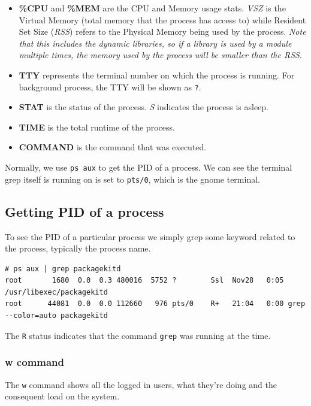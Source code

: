 \begin{itemize}
\begin{itemize}
		\item \textbf{\%CPU} and \textbf{\%MEM} are the CPU and Memory usage stats. \textit{VSZ} is the Virtual Memory (total memory that the process has access to) while Resident Set Size (\textit{RSS}) refers to the Physical Memory being used by the process. \textit{Note that this includes the dynamic libraries, so if a library is used by a module multiple times, the memory used by the process will be smaller than the RSS}.
		
		\item \textbf{TTY} represents the terminal number on which the process is running. For background process, the TTY will be shown as \verb|?|. 
		
		\item \textbf{STAT} is the status of the process. \textit{S} indicates the process is asleep. 
		
		\item \textbf{TIME} is the total runtime of the process.
		\item \textbf{COMMAND} is the command that was executed.
	\end{itemize}
\end{itemize}

Normally, we use \verb|ps aux| to get the PID of a process. We can see the terminal grep itself is running on is set to \verb|pts/0|, which is the gnome terminal. 

\subsection{Getting PID of a process}
To see the PID of a particular process we simply grep some keyword related to the process, typically the process name. 

\vspace{-15pt}
\begin{verbatim}
# ps aux | grep packagekitd
root       1680  0.0  0.3 480016  5752 ?        Ssl  Nov28   0:05 /usr/libexec/packagekitd
root      44081  0.0  0.0 112660   976 pts/0    R+   21:04   0:00 grep --color=auto packagekitd
\end{verbatim}
\vspace{-10pt}

The \verb|R| status indicates that the command \verb|grep| was running at the time.

\subsubsection{w command}
\vspace{-10pt}
The \verb|w| command shows all the logged in users, what they're doing and the consequent load on the system. 

